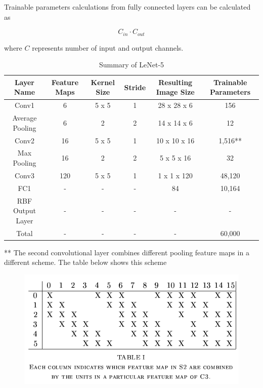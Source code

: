 \documentclass[11pt]{article}
\theoremstyle{definition}
\begin{document}
\bigskip 

Trainable parameters calculations from fully connected layers can be calculated as 

\[ C_{in} \cdot C_{out}\]

where $C$ represents number of input and output channels. 


\begin{table}[H]
\centering
\begin{tabular}{| c | c | c | c | c | c |}
\hline
Layer Name & Feature Maps & Kernel Size & Stride & Resulting Image Size &  Trainable Parameters\\
\hline
Conv1 & 6 & 5 x 5 & 1 & 28 x 28 x 6 & 156\\
\hline
Average Pooling & 6 & 2 & 2 & 14 x 14 x 6 & 12\\
\hline
Conv2 & 16 & 5 x 5& 1 & 10 x 10 x 16 & 1,516**\\
\hline
Max Pooling & 16 & 2 & 2 & 5 x 5 x 16 & 32 \\
\hline
Conv3 & 120 & 5 x 5 & 1 & 1 x 1 x 120 & 48,120 \\
\hline
FC1 & -  &  - &  - & 84 & 10,164 \\
\hline
RBF Output Layer & - & - & - & - & - \\
\hline
Total & - & - & - & - & 60,000 \\
\hline
\end{tabular}
\caption{Summary of LeNet-5}
\end{table}

** The second convolutional layer combines different pooling feature maps in a different scheme. The table below shows this scheme
\begin{figure}[H]
\begin{center}
  \includegraphics[width=\linewidth,keepaspectratio]{images/S2C3.png}
\end{center}
\end{figure}
\end{document}

